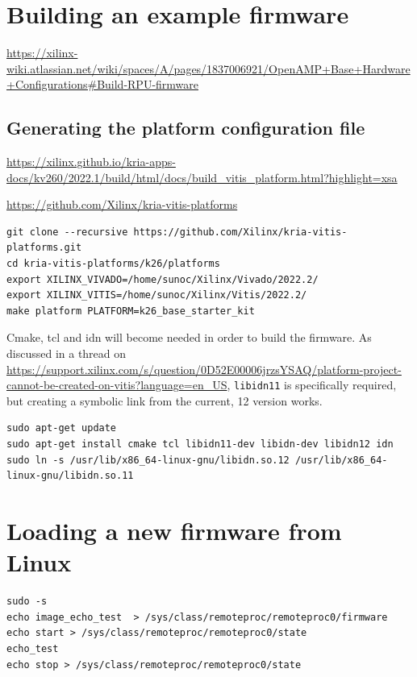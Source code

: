 \documentclass[10pt]{article}
\begin{document}
\section{Building an example firmware}
\label{sec:bulding-an-example}
\href{Xilinx documentation about building a demo firmware}{https://xilinx-wiki.atlassian.net/wiki/spaces/A/pages/1837006921/OpenAMP+Base+Hardware+Configurations\#Build-RPU-firmware}

\subsection{Generating the platform configuration file}
\label{sec:gener-platf-conf}

\url{https://xilinx.github.io/kria-apps-docs/kv260/2022.1/build/html/docs/build_vitis_platform.html?highlight=xsa}

\url{https://github.com/Xilinx/kria-vitis-platforms}

\begin{tcolorbox}
\begin{verbatim}
git clone --recursive https://github.com/Xilinx/kria-vitis-platforms.git
cd kria-vitis-platforms/k26/platforms
export XILINX_VIVADO=/home/sunoc/Xilinx/Vivado/2022.2/
export XILINX_VITIS=/home/sunoc/Xilinx/Vitis/2022.2/
make platform PLATFORM=k26_base_starter_kit
\end{verbatim}
\end{tcolorbox}

Cmake, tcl and idn will become needed in order to build the firmware.
As discussed in a thread on \href{Xilinx community forum}{https://support.xilinx.com/s/question/0D52E00006jrzsYSAQ/platform-project-cannot-be-created-on-vitis?language=en\_US}, \verb|libidn11| is specifically required, but
creating a symbolic link from the current, 12 version works.
\begin{tcolorbox}
\begin{verbatim}
sudo apt-get update
sudo apt-get install cmake tcl libidn11-dev libidn-dev libidn12 idn
sudo ln -s /usr/lib/x86_64-linux-gnu/libidn.so.12 /usr/lib/x86_64-linux-gnu/libidn.so.11
\end{verbatim}
\end{tcolorbox}


\section{Loading a new firmware from Linux}
\label{sec:loading-new-firmware}


\begin{tcolorbox}
\begin{verbatim}
sudo -s
echo image_echo_test  > /sys/class/remoteproc/remoteproc0/firmware
echo start > /sys/class/remoteproc/remoteproc0/state
echo_test
echo stop > /sys/class/remoteproc/remoteproc0/state
\end{verbatim}
\end{tcolorbox}
\end{document}
